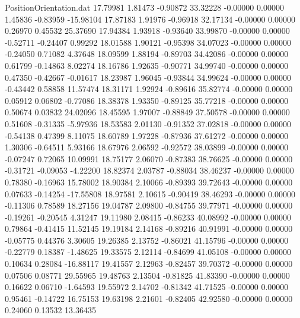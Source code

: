 \begin{filecontents}{PositionOrientation.dat}
  17.79981    1.81473   -0.90872    33.32228   -0.00000    0.00000    1.45836   -0.83959  -15.98104
  17.87183    1.91976   -0.96918    32.17134   -0.00000    0.00000    0.26970    0.45532   25.37690
  17.94384    1.93918   -0.93640    33.99870   -0.00000    0.00000   -0.52711   -0.24407    0.99292
  18.01588    1.90121   -0.95398    34.07023   -0.00000    0.00000   -0.24050    0.71082    4.37648
  18.09599    1.88194   -0.89703    34.42086   -0.00000    0.00000    0.61799   -0.14863    8.02274
  18.16786    1.92635   -0.90771    34.99740   -0.00000    0.00000    0.47350   -0.42667   -0.01617
  18.23987    1.96045   -0.93844    34.99624   -0.00000    0.00000   -0.43442    0.58858   11.57474
  18.31171    1.92924   -0.89616    35.82774   -0.00000    0.00000    0.05912    0.06802   -0.77086
  18.38378    1.93350   -0.89125    35.77218   -0.00000    0.00000    0.50674    0.03832   24.02096
  18.45595    1.97007   -0.88849    37.50578   -0.00000    0.00000    0.51608   -0.31335   -5.97936
  18.53583    2.01130   -0.91352    37.02818   -0.00000    0.00000   -0.54138    0.47399    8.11075
  18.60789    1.97228   -0.87936    37.61272   -0.00000    0.00000    1.30306   -0.64511    5.93166
  18.67976    2.06592   -0.92572    38.03899   -0.00000    0.00000   -0.07247    0.72065   10.09991
  18.75177    2.06070   -0.87383    38.76625   -0.00000    0.00000   -0.31721   -0.09053   -4.22200
  18.82374    2.03787   -0.88034    38.46237   -0.00000    0.00000    0.78380   -0.16963   15.78002
  18.90384    2.10066   -0.89393    39.72643   -0.00000    0.00000    0.07633   -0.14254  -17.55808
  18.97581    2.10615   -0.90419    38.46293   -0.00000    0.00000   -0.11306    0.78589   18.27156
  19.04787    2.09800   -0.84755    39.77971   -0.00000    0.00000   -0.19261   -0.20545    4.31247
  19.11980    2.08415   -0.86233    40.08992   -0.00000    0.00000    0.79864   -0.41415   11.52145
  19.19184    2.14168   -0.89216    40.91991   -0.00000    0.00000   -0.05775    0.44376    3.30605
  19.26385    2.13752   -0.86021    41.15796   -0.00000    0.00000   -0.22779    0.18387   -1.48625
  19.33575    2.12114   -0.84699    41.05108   -0.00000    0.00000    0.10634    0.28084  -16.88117
  19.41557    2.12963   -0.82457    39.70372   -0.00000    0.00000    0.07506    0.08771   29.55965
  19.48763    2.13504   -0.81825    41.83390   -0.00000    0.00000    0.16622    0.06710   -1.64593
  19.55972    2.14702   -0.81342    41.71525   -0.00000    0.00000    0.95461   -0.14722   16.75153
  19.63198    2.21601   -0.82405    42.92580   -0.00000    0.00000    0.24060    0.13532   13.36435

\end{filecontents}
